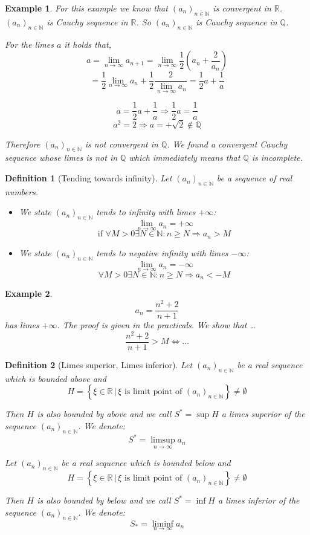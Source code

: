 \documentclass[a4paper,landscape,twocolumn]{article}
\newtheorem{defi}{Definition}
\newtheorem{ex}{Example}
\newcommand\setdef[2]{\left\{#1\,|\,#2\right\}}
\newcommand\seq[1]{{\left(#1\right)}_{n \in \mathbb N}}
\begin{document}
\begin{ex}
  For this example we know that $\seq{a_n}$ is convergent in $\mathbb R$.
  $\seq{a_n}$ is Cauchy sequence in $\mathbb R$.
  So $\seq{a_n}$ is Cauchy sequence in $\mathbb Q$.

  For the limes $a$ it holds that,
  \[ a = \lim_{n\to\infty} a_{n+1} = \lim_{n\to\infty} \frac12 \left(a_n + \frac{2}{a_n}\right) \]
  \[ = \frac12 \lim_{n\to\infty} a_n + \frac12 \frac{2}{\lim_{n\to\infty} a_n} = \frac12 a + \frac1a \]

  \[ a = \frac12 a + \frac1a \Rightarrow \frac12 a = \frac1a \]
  \[ a^2 = 2 \Rightarrow a = +\sqrt{2} \not\in \mathbb Q \]

  Therefore $\seq{a_n}$ is \emph{not} convergent in $\mathbb Q$.
  We found a convergent Cauchy sequence whose limes is not in $\mathbb Q$ which
  immediately means that $\mathbb Q$ is incomplete.
\end{ex}

\begin{defi}[Tending towards infinity]
  Let $\seq{a_n}$ be a sequence of real numbers.
  \begin{itemize}
    \item
      We state $\seq{a_n}$ \emph{tends to infinity} with limes $+\infty$:
      \[ \lim_{n\to\infty} a_n = +\infty \]
      \[ \text{if } \forall M > 0 \exists N \in \mathbb N: n \geq N \Rightarrow a_n > M \]
    \item
      We state $\seq{a_n}$ \emph{tends to negative infinity} with limes $-\infty$:
      \[ \lim_{n\to\infty} a_n = -\infty \]
      \[ \forall M > 0 \exists N \in \mathbb N: n \geq N \Rightarrow a_n < -M \]
  \end{itemize}
\end{defi}
\begin{ex}
  \[ a_n = \frac{n^2 + 2}{n+1} \]
  has limes $+\infty$.
  The proof is given in the practicals. We show that \dots
  \[ \frac{n^2 + 2}{n + 1} > M \Leftrightarrow \dots \]
\end{ex}

\begin{defi}[Limes superior, Limes inferior]
  Let $\seq{a_n}$ be a real sequence which is bounded above and
  \[ H = \setdef{\xi \in \mathbb R}{\xi \text{ is limit point of } \seq{a_n}} \neq \emptyset \]

  Then $H$ is also bounded by above and we call $S^* = \sup{H}$ a \emph{limes superior}
  of the sequence $\seq{a_n}$. We denote:
  \[ S^* = \limsup_{n\to\infty} a_n \]

  Let $\seq{a_n}$ be a real sequence which is bounded below and
  \[ H = \setdef{\xi \in \mathbb R}{\xi \text{ is limit point of } \seq{a_n}} \neq \emptyset \]

  Then $H$ is also bounded by below and we call $S^* = \inf{H}$ a \emph{limes inferior}
  of the sequence $\seq{a_n}$. We denote:
  \[ S_* = \liminf_{n\to\infty} a_n \]
\end{defi}
\end{document}
